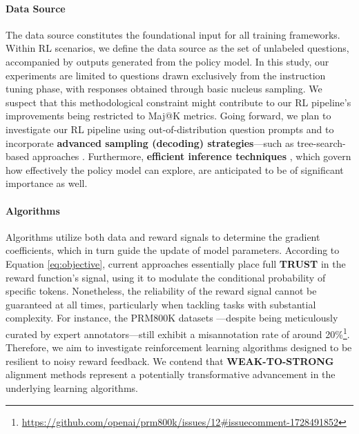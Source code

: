 \begin{itemize}[topsep=0pt]
\begin{itemize}[topsep=0pt]
\paragraph{Data Source} The data source constitutes the foundational input for all training frameworks. Within RL scenarios, we define the data source as the set of unlabeled questions, accompanied by outputs generated from the policy model. In this study, our experiments are limited to questions drawn exclusively from the instruction tuning phase, with responses obtained through basic nucleus sampling. We suspect that this methodological constraint might contribute to our RL pipeline’s improvements being restricted to Maj@K metrics. Going forward, we plan to investigate our RL pipeline using out-of-distribution question prompts and to incorporate \textbf{advanced sampling (decoding) strategies}—such as tree-search-based approaches \citep{yao2023tree}. Furthermore, \textbf{efficient inference techniques} \citep{xia-etal-2023-speculative,leviathan2023fast,kwon2023efficient,xia2024unlocking}, which govern how effectively the policy model can explore, are anticipated to be of significant importance as well.

\paragraph{Algorithms} Algorithms utilize both data and reward signals to determine the gradient coefficients, which in turn guide the update of model parameters. According to Equation \ref{eq:objective}, current approaches essentially place full \textbf{TRUST} in the reward function's signal, using it to modulate the conditional probability of specific tokens. Nonetheless, the reliability of the reward signal cannot be guaranteed at all times, particularly when tackling tasks with substantial complexity. For instance, the PRM800K datasets \citep{lightman2023let}—despite being meticulously curated by expert annotators—still exhibit a misannotation rate of around 20\%\footnote{\url{https://github.com/openai/prm800k/issues/12\#issuecomment-1728491852}}. Therefore, we aim to investigate reinforcement learning algorithms designed to be resilient to noisy reward feedback. We contend that \textbf{WEAK-TO-STRONG} alignment methods \citep{burns2023weak} represent a potentially transformative advancement in the underlying learning algorithms.


\end{itemize}
\end{itemize}
